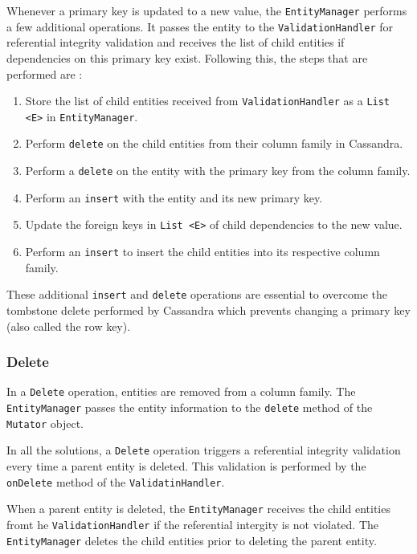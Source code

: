 		Whenever a primary key is updated to a new value, the
		\texttt{EntityManager} performs a few additional operations. It passes the entity to the
		\texttt{ValidationHandler} for referential integrity validation and receives
		the list of child entities if dependencies on this primary key exist.
		Following this, the steps that are performed are :
		\begin{enumerate}
		  \item Store the list of child entities received from
		  \texttt{ValidationHandler} as a \texttt{List <E>} in
		  \texttt{EntityManager}.
		  \item Perform \texttt{delete} on the child entities from their column family
		  in Cassandra.
		  \item Perform a \texttt{delete} on the entity with the primary key from the
		  column family.
		  \item Perform an \texttt{insert} with the entity and its new primary key.
		  \item Update the foreign keys in \texttt{List <E>} of child dependencies to
		  the new value.
		  \item Perform an \texttt{insert} to insert the child entities into its
		  respective column family.
		\end{enumerate}
		
		These additional \texttt{insert} and \texttt{delete} operations are essential
		to overcome the tombstone delete performed by Cassandra which prevents
		changing a primary key (also called the row key).
		
		\subsubsection{Delete}\label{ss:delete}
		In a  \texttt{Delete} operation, entities are removed from a column
		family. The \texttt{EntityManager} passes the entity
		information to the \texttt{delete} method of the \texttt{Mutator} object.
		
		In all the solutions,  a \texttt{Delete} operation triggers a referential
		integrity validation every time a parent entity is deleted. This validation is performed by
 		the \texttt{onDelete} method of the \texttt{ValidatinHandler}.
 		
 		When a parent entity is deleted, the \texttt{EntityManager} receives the
 		child entities fromt he \texttt{ValidationHandler} if the referential
 		intergity is not violated. The \texttt{EntityManager} deletes the child
 		entities prior to deleting the parent entity.
		
